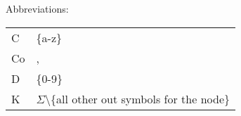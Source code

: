\documentclass[11pt]{amsart}
\begin{document}
Abbreviations:
\begin{center}
\begin{tabular}{ll}
C & \{a-z\}\\
Co& , \\
D  & \{0-9\}\\
K & $\Sigma$\textbackslash \{all other out symbols for the node\} \\
\end{tabular}
\end{center}
\end{document}
